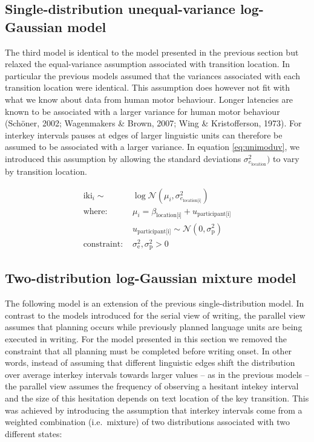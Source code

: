 \documentclass[
  man,floatsintext]{apa7}
\begin{document}
\hypertarget{single-distribution-unequal-variance-log-gaussian-model}{%
\subsection{Single-distribution unequal-variance log-Gaussian model}\label{single-distribution-unequal-variance-log-gaussian-model}}

The third model is identical to the model presented in the previous section but relaxed the equal-variance assumption associated with transition location. In particular the previous models assumed that the variances associated with each transition location were identical. This assumption does however not fit with what we know about data from human motor behaviour. Longer latencies are known to be associated with a larger variance for human motor behaviour (Schöner, 2002; Wagenmakers \& Brown, 2007; Wing \& Kristofferson, 1973). For interkey intervals pauses at edges of larger linguistic units can therefore be assumed to be associated with a larger variance. In equation \ref{eq:unimoduv}, we introduced this assumption by allowing the standard deviations \(\sigma_{e_\text{location}}^2)\) to vary by transition location.

\begin{equation}
\begin{aligned}
\label{eq:unimoduv}
\text{iki}_i \sim\text{ } & \log\mathcal{N}(\mu_i, \sigma_{e_\text{location[i]}}^2) \\
\text{where: } & \mu_i = \beta_\text{location[i]} + u_\text{participant[i]}\\
 & u_\text{participant[i]} \sim \mathcal{N}(0, \sigma_\text{p}^2) \\
 \text{constraint: } & \sigma_\text{e}^2, \sigma_\text{p}^2>0
\end{aligned}
\end{equation}

\hypertarget{two-distribution-log-gaussian-mixture-model}{%
\subsection{Two-distribution log-Gaussian mixture model}\label{two-distribution-log-gaussian-mixture-model}}

The following model is an extension of the previous single-distribution model. In contrast to the models introduced for the serial view of writing, the parallel view assumes that planning occurs while previously planned language units are being executed in writing. For the model presented in this section we removed the constraint that all planning must be completed before writing onset. In other words, instead of assuming that different linguistic edges shift the distribution over average interkey intervals towards larger values -- as in the previous models -- the parallel view assumes the frequency of observing a hesitant intekey interval and the size of this hesitation depends on text location of the key transition. This was achieved by introducing the assumption that interkey intervals come from a weighted combination (i.e.~mixture) of two distributions associated with two different states:
\end{document}
